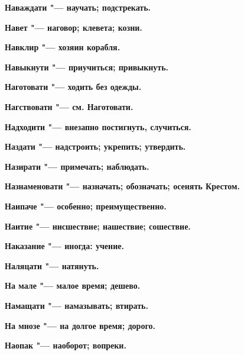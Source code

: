 \begin{mymulticols}{2}
\bfseries Наваждати\normalfont{} "--- научать; подстрекать. 




\bfseries Навет\normalfont{} "--- наговор; клевета; козни. 




\bfseries Навклир\normalfont{} "--- хозяин корабля. 




\bfseries Навыкнути\normalfont{} "--- приучиться; привыкнуть. 




\bfseries Наготовати\normalfont{} "--- ходить без одежды. 




\bfseries Нагствовати\normalfont{} "--- см. Наготовати. 




\bfseries Надходити\normalfont{} "--- внезапно постигнуть, случиться. 




\bfseries Наздати\normalfont{} "--- надстроить; укрепить; утвердить. 




\bfseries Назирати\normalfont{} "--- примечать; наблюдать. 




\bfseries Назнаменовати\normalfont{} "--- назначать; обозначать; осенять Крестом. 




\bfseries Наипаче\normalfont{} "--- особенно; преимущественно. 




\bfseries Наитие\normalfont{} "--- нисшествие; нашествие; сошествие. 




\bfseries Наказание\normalfont{} "--- иногда: учение. 




\bfseries Наляцати\normalfont{} "--- натянуть. 




\bfseries На мале\normalfont{} "--- малое время; дешево. 




\bfseries Намащати\normalfont{} "--- намазывать; втирать. 




\bfseries На мнозе\normalfont{} "--- на долгое время; дорого. 




\bfseries Наопак\normalfont{} "--- наоборот; вопреки. 





\end{mymulticols}

